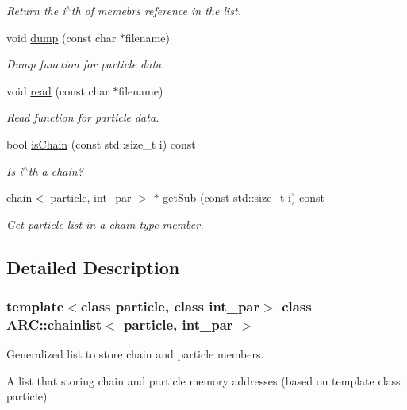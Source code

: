 \begin{DoxyCompactItemize}
\begin{DoxyCompactList}\small\item\em Return the i$^\wedge$th of memebr\textquotesingle{}s reference in the list. \end{DoxyCompactList}\item 
void \hyperlink{classARC_1_1chainlist_aee6dffa94abf22c8f5bc120f5a1fecbd}{dump} (const char $\ast$filename)
\begin{DoxyCompactList}\small\item\em Dump function for particle data. \end{DoxyCompactList}\item 
void \hyperlink{classARC_1_1chainlist_ad00d02518aa974cca1f82eec5d60afdd}{read} (const char $\ast$filename)
\begin{DoxyCompactList}\small\item\em Read function for particle data. \end{DoxyCompactList}\item 
bool \hyperlink{classARC_1_1chainlist_af3ec0d68872c99069015fe6f5f5ba4b4}{is\+Chain} (const std\+::size\+\_\+t i) const
\begin{DoxyCompactList}\small\item\em Is i$^\wedge$th a chain? \end{DoxyCompactList}\item 
\hyperlink{classARC_1_1chain}{chain}$<$ particle, int\+\_\+par $>$ $\ast$ \hyperlink{classARC_1_1chainlist_a4ded066f2323845befd92b1109ccdeb0}{get\+Sub} (const std\+::size\+\_\+t i) const
\begin{DoxyCompactList}\small\item\em Get particle list in a chain type member. \end{DoxyCompactList}\end{DoxyCompactItemize}


\subsection{Detailed Description}
\subsubsection*{template$<$class particle, class int\+\_\+par$>$\newline
class A\+R\+C\+::chainlist$<$ particle, int\+\_\+par $>$}

Generalized list to store chain and particle members. 

A list that storing chain and particle memory addresses (based on template class particle) 

